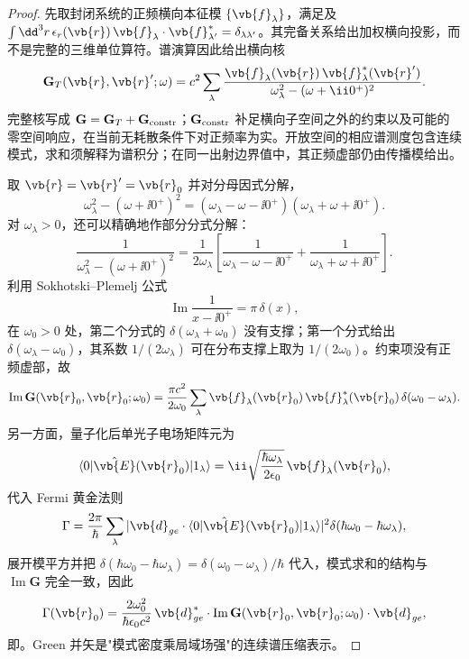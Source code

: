 \begin{proof}
先取封闭系统的正频横向本征模 $\{\vb{f}_\lambda\}$，满足及 $\int\dd^3r\,\epsilon_r(\vb{r})\,\vb{f}_\lambda\cdot\vb{f}_{\lambda'}^*=\delta_{\lambda\lambda'}$。其完备关系给出加权横向投影，而不是完整的三维单位算符。谱演算因此给出横向核
\begin{equation*}
\mathbf G_T(\vb{r},\vb{r}';\omega)
= c^2\sum_\lambda
 \frac{\vb{f}_\lambda(\vb{r})\,\vb{f}_\lambda^*(\vb{r}')}
 {\omega_\lambda^2-(\omega+\ii0^+)^2}.
\end{equation*}
完整核写成 $\mathbf G=\mathbf G_T+\mathbf G_{\rm constr}$；$\mathbf G_{\rm constr}$ 补足横向子空间之外的约束以及可能的零空间响应，在当前无耗散条件下对正频率为实。开放空间的相应谱测度包含连续模式，求和须解释为谱积分；在同一出射边界值中，其正频虚部仍由传播模给出。

取 $\vb{r}=\vb{r}'=\vb{r}_0$ 并对分母因式分解，
\begin{equation*}
\omega_\lambda^2-(\omega+\ii0^+)^2
= (\omega_\lambda-\omega-\ii0^+)(\omega_\lambda+\omega+\ii0^+).
\end{equation*}
对 $\omega_\lambda>0$，还可以精确地作部分分式分解：
\begin{equation*}
\frac1{\omega_\lambda^2-(\omega+\ii0^+)^2}
=\frac1{2\omega_\lambda}
\left[\frac1{\omega_\lambda-\omega-\ii0^+}
+\frac1{\omega_\lambda+\omega+\ii0^+}\right].
\end{equation*}
利用 Sokhotski--Plemelj 公式
\begin{equation*}
\operatorname{Im}\frac{1}{x-\ii0^+}=\pi\,\delta(x),
\end{equation*}
在 $\omega_0>0$ 处，第二个分式的 $\delta(\omega_\lambda+\omega_0)$ 没有支撑；第一个分式给出 $\delta(\omega_\lambda-\omega_0)$，其系数 $1/(2\omega_\lambda)$ 可在分布支撑上取为 $1/(2\omega_0)$。约束项没有正频虚部，故
\begin{equation*}
\operatorname{Im}\mathbf G(\vb{r}_0,\vb{r}_0;\omega_0)
= \frac{\pi c^2}{2\omega_0}\sum_\lambda
 \vb{f}_\lambda(\vb{r}_0)\,\vb{f}_\lambda^*(\vb{r}_0)\,
 \delta(\omega_0-\omega_\lambda).
\end{equation*}
另一方面，量子化后单光子电场矩阵元为
\begin{equation*}
\langle 0|\hat{\vb{E}}(\vb{r}_0)|1_\lambda\rangle
= \ii\sqrt{\frac{\hbar\omega_\lambda}{2\epsilon_0}}\,
 \vb{f}_\lambda(\vb{r}_0),
\end{equation*}
代入 Fermi 黄金法则
\begin{equation*}
\Gamma = \frac{2\pi}{\hbar}\sum_\lambda
 |\vb{d}_{ge}\cdot\langle 0|\hat{\vb{E}}(\vb{r}_0)|1_\lambda\rangle|^2
 \delta(\hbar\omega_0-\hbar\omega_\lambda),
\end{equation*}
展开模平方并把 $\delta(\hbar\omega_0-\hbar\omega_\lambda)=\delta(\omega_0-\omega_\lambda)/\hbar$ 代入，模式求和的结构与 $\operatorname{Im}\mathbf G$ 完全一致，因此
\begin{equation*}
\Gamma(\vb{r}_0)
= \frac{2\omega_0^2}{\hbar\epsilon_0 c^2}\,
 \vb{d}_{ge}^*\cdot
 \operatorname{Im}\mathbf G(\vb{r}_0,\vb{r}_0;\omega_0)\cdot
 \vb{d}_{ge},
\end{equation*}
即。Green 并矢是"模式密度乘局域场强"的连续谱压缩表示。
\end{proof}

